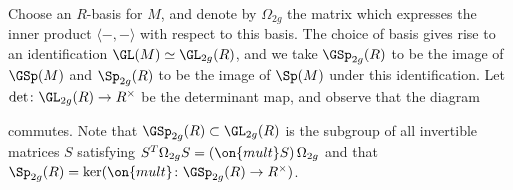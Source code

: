 Choose an $R$-basis for $M$, and denote by $\Omega_{2g}$ the matrix which expresses the inner product $\langle - , - \rangle$ with respect to this basis.
The choice of basis gives rise to an identification $\GL(M) \simeq \GL_{2g}(R)$, and we take $\GSp_{2g}(R)$ to be the image of $\GSp(M)$ and $\Sp_{2g}(R)$ to be the image of $\Sp(M)$ under this identification. Let $\det \colon \GL_{2g}(R) \to R^\times$ be the determinant map, and observe that the diagram
\begin{center}
\end{center}

\noindent commutes. Note
that $\GSp_{2g}(R) \subset \GL_{2g}(R)$ is the subgroup of all invertible matrices $S$ satisfying $S^T \Omega_{2g} S = (\on{mult} S) \, \Omega_{2g}$ 
and that $\Sp_{2g}(R) = \ker(\on{mult} \colon \GSp_{2g}(R) \to R^\times)$.

